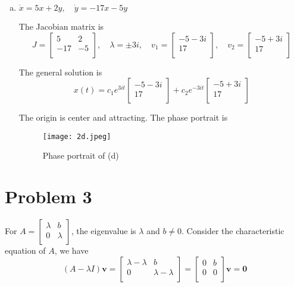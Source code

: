 \documentclass[12pt]{exam}
\begin{document}
\begin{enumerate}[(a)]
	\item $\dot{x} = 5x+2y, \quad \dot{y} = -17x-5y$
	
	The Jacobian matrix is
	\[ J = \begin{bmatrix}
		5 & 2 \\
		-17 & -5 \\
	\end{bmatrix} , \quad \lambda = \pm 3i , \quad v_1= \begin{bmatrix}
	-5-3i \\
	17 \\
	\end{bmatrix} , \quad v_2 = \begin{bmatrix}
	-5+3i \\
	17 \\
	\end{bmatrix} \]

	The general solution is
	\[ x(t) = c_1e^{3it} \begin{bmatrix}
		-5-3i \\
		17 \\
		\end{bmatrix} + c_2e^{-3it} \begin{bmatrix}
		-5+3i \\
		17 \\
		\end{bmatrix} \]
	
	The origin is center and attracting. The phase portrait is

	\begin{figure}[H]
		\centering
		\texttt{[image: 2d.jpeg]}
		\caption{Phase portrait of (d)}
		\label{fig:2d}
	\end{figure}


\end{enumerate}

\section*{Problem 3}

For $A = \begin{bmatrix}
	\lambda & b \\
	0 & \lambda \\
\end{bmatrix}$, the eigenvalue is $\lambda$ and $b \not= 0$. Consider the characteristic equation of $A$, we have
\[(A-\lambda I)\mathbf{v} = \begin{bmatrix}
	\lambda - \lambda & b \\
	0 & \lambda - \lambda \\
	\end{bmatrix} = \begin{bmatrix}
	0 & b \\
	0 & 0 \\
	\end{bmatrix} \mathbf{v} = \mathbf{0} \]
\end{document}
